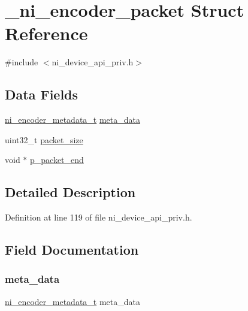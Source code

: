 \hypertarget{struct__ni__encoder__packet}{}\section{\+\_\+ni\+\_\+encoder\+\_\+packet Struct Reference}
\label{struct__ni__encoder__packet}


{\ttfamily \#include $<$ni\+\_\+device\+\_\+api\+\_\+priv.\+h$>$}

\subsection*{Data Fields}
\begin{DoxyCompactItemize}
\item 
\mbox{\hyperlink{ni__device__api__priv_8h_a35112489a710ab937db9975f8a00d390}{ni\+\_\+encoder\+\_\+metadata\+\_\+t}} \mbox{\hyperlink{struct__ni__encoder__packet_a26065fd1e4415fca999a8c9ef858b15a}{meta\+\_\+data}}
\item 
uint32\+\_\+t \mbox{\hyperlink{struct__ni__encoder__packet_a09f4c6f4095f89f83910575805e57368}{packet\+\_\+size}}
\item 
void $\ast$ \mbox{\hyperlink{struct__ni__encoder__packet_aba52d034bd80dab3938bb013df031c25}{p\+\_\+packet\+\_\+end}}
\end{DoxyCompactItemize}


\subsection{Detailed Description}


Definition at line 119 of file ni\+\_\+device\+\_\+api\+\_\+priv.\+h.



\subsection{Field Documentation}
\mbox{\label{struct__ni__encoder__packet_a26065fd1e4415fca999a8c9ef858b15a}} 
\subsubsection{\texorpdfstring{meta\_data}{meta\_data}}
{\footnotesize\ttfamily \mbox{\hyperlink{ni__device__api__priv_8h_a35112489a710ab937db9975f8a00d390}{ni\+\_\+encoder\+\_\+metadata\+\_\+t}} meta\+\_\+data}



